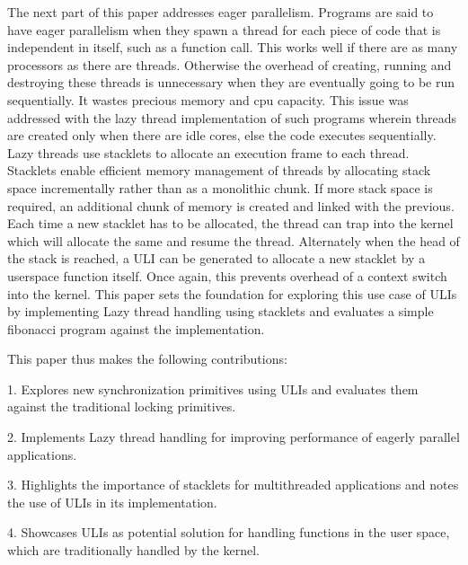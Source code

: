 The next part of this paper addresses eager parallelism. Programs are said
to have eager parallelism when they spawn a thread for each piece of code that
is independent in itself, such as a function call. This works well if there are
as many processors as there are threads. Otherwise the overhead of creating,
running and destroying these threads is unnecessary when they are eventually
going to be run sequentially. It wastes precious memory and cpu capacity. This
issue was addressed with the lazy thread implementation of such programs wherein
threads are created only when there are idle cores, else the code executes
sequentially. Lazy threads use stacklets to allocate an execution frame to each
thread. Stacklets enable efficient memory management of threads by allocating
stack space incrementally rather than as a monolithic chunk. If more stack space
is required, an additional chunk of memory is created and linked with the
previous. Each time a new stacklet has to be allocated, the thread can trap into
the kernel which will allocate the same and resume the thread. Alternately when
the head of the stack is reached, a ULI can be generated to allocate a new
stacklet by a userspace function itself. Once again, this prevents overhead of a
context switch into the kernel. This paper sets the foundation for exploring
this use case of ULIs by implementing Lazy thread handling using stacklets and
evaluates a simple fibonacci program against the implementation.

This paper thus makes the following contributions:

1. Explores new synchronization primitives using ULIs and evaluates them against
the traditional locking primitives.

2. Implements Lazy thread handling for improving performance of eagerly parallel
applications.

3. Highlights the importance of stacklets for multithreaded applications and
notes the use of ULIs in its implementation.

4. Showcases ULIs as potential solution for handling functions in the user space,
which are traditionally handled by the kernel.

